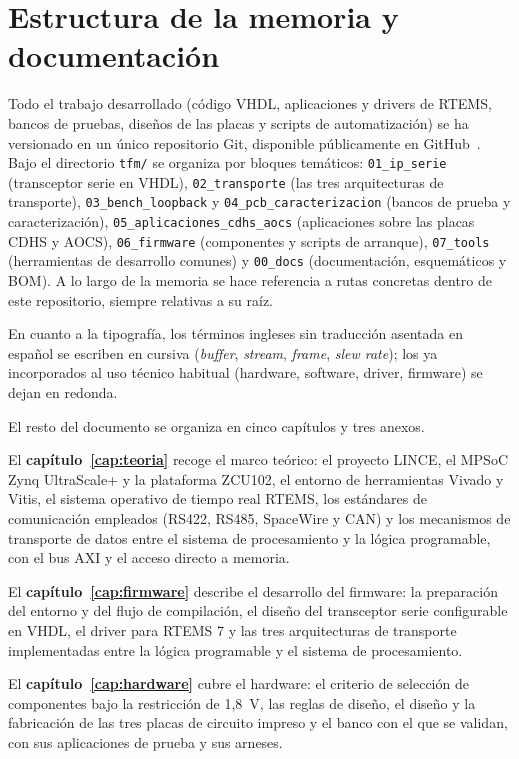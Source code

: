 \section{Estructura de la memoria y documentación}

Todo el trabajo desarrollado (código VHDL, aplicaciones y drivers de RTEMS, bancos de pruebas,
diseños de las placas y scripts de automatización) se ha versionado en un único repositorio Git,
disponible públicamente en GitHub~\cite{repo_tfm}. Bajo el directorio \texttt{tfm/} se organiza
por bloques temáticos:
\texttt{01\_ip\_serie} (transceptor serie en VHDL), \texttt{02\_transporte} (las tres
arquitecturas de transporte), \texttt{03\_bench\_loopback} y \texttt{04\_pcb\_caracterizacion}
(bancos de prueba y caracterización), \texttt{05\_aplicaciones\_cdhs\_aocs} (aplicaciones sobre las
placas CDHS y AOCS), \texttt{06\_firmware} (componentes y scripts de arranque),
\texttt{07\_tools} (herramientas de desarrollo comunes) y \texttt{00\_docs} (documentación,
esquemáticos y BOM). A lo largo de la memoria se hace referencia a rutas concretas dentro de este
repositorio, siempre relativas a su raíz.

En cuanto a la tipografía, los términos ingleses sin traducción asentada en español se escriben
en cursiva (\textit{buffer}, \textit{stream}, \textit{frame}, \textit{slew rate}); los ya
incorporados al uso técnico habitual (hardware, software, driver, firmware) se dejan en redonda.





El resto del documento se organiza en cinco capítulos y tres anexos.

El \textbf{capítulo~\ref{cap:teoria}} recoge el marco teórico: el proyecto LINCE, el MPSoC Zynq UltraScale+ y la
plataforma ZCU102, el entorno de herramientas Vivado y Vitis, el sistema operativo de tiempo real
RTEMS, los estándares de comunicación empleados (RS422, RS485, SpaceWire y CAN) y los mecanismos
de transporte de datos entre el sistema de procesamiento y la lógica programable, con el bus AXI y
el acceso directo a memoria.

El \textbf{capítulo~\ref{cap:firmware}} describe el desarrollo del firmware: la preparación del
entorno y del flujo de compilación, el diseño del transceptor serie configurable en VHDL, el
driver para RTEMS 7 y las tres arquitecturas de transporte implementadas entre la lógica
programable y el sistema de procesamiento.

El \textbf{capítulo~\ref{cap:hardware}} cubre el hardware: el criterio de selección de componentes
bajo la restricción de 1,8~V, las reglas de diseño, el diseño y la fabricación de las tres placas
de circuito impreso y el banco con el que se validan, con sus aplicaciones de prueba y sus
arneses.


